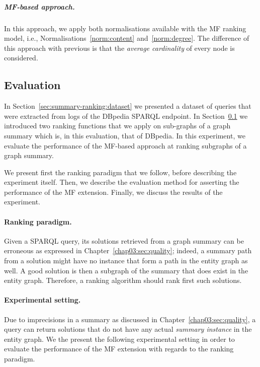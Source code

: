 
\subparagraph{MF-based approach.}

In this approach, we apply both normalisations available with the \gls{MF} ranking model, i.e., Normalisations~\ref{norm:content} and~\ref{norm:degree}. The difference of this approach with previous is that the \emph{average cardinality} of every node is considered.

\subsection{Evaluation}
\label{sec:summary-ranking:eval}

In Section~\ref{sec:summary-ranking:dataset} we presented a dataset of queries that were extracted from logs of the DBpedia SPARQL endpoint. In Section~\ref{sec:summary-ranking:eval} we introduced two ranking functions that we apply on sub-graphs of a graph summary which is, in this evaluation, that of DBpedia.
In this experiment, we evaluate the performance of the \gls{MF}-based approach at ranking subgraphs of a graph summary.

We present first the ranking paradigm that we follow, before describing the experiment itself. Then, we describe the evaluation method for asserting the performance of the \gls{MF} extension. Finally, we discuss the results of the experiment.

\paragraph{Ranking paradigm.}

Given a SPARQL query, its solutions retrieved from a graph summary can be erroneous as expressed in Chapter~\ref{chap03:sec:quality}; indeed, a summary path from a solution might have no instance that form a path in the entity graph as well. A good solution is then a subgraph of the summary that does exist in the entity graph. Therefore, a ranking algorithm should rank first such solutions.

\paragraph{Experimental setting.}

Due to imprecisions in a summary as discussed in Chapter~\ref{chap03:sec:quality}, a query can return solutions that do not have any actual \emph{summary instance} in the entity graph. We the present the following experimental setting in order to evaluate the performance of the \gls{MF} extension with regards to the ranking paradigm.\\

